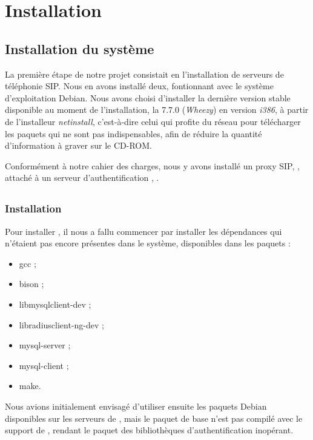 \section{Installation}

\subsection{Installation du système}

La première étape de notre projet consistait en l’installation de serveurs de téléphonie SIP. Nous en avons installé deux, fontionnant avec le système d’exploitation Debian. Nous avons choisi d’installer la dernière version stable disponible au moment de l’installation, la 7.7.0 (\textit{Wheezy}) en version \textit{i386}, à partir de l’installeur \textit{netinstall}, c’est-à-dire celui qui profite du réseau pour télécharger les paquets qui ne sont pas indispensables, afin de réduire la quantité d’information à graver sur le CD-ROM.

Conformément à notre cahier des charges, nous y avons installé un proxy SIP, {\kam}, attaché à un serveur d’authentification {\rad}, {\frad}.

\subsection{\kam}

\subsubsection{Installation}

Pour installer {\kam}, il nous a fallu commencer par installer les dépendances qui n’étaient pas encore présentes dans le système, disponibles dans les paquets :

\begin{itemize}
	\item{gcc} ;
	\item{bison} ;
	\item{libmysqlclient-dev} ;
	\item{libradiusclient-ng-dev} ;
	\item{mysql-server} ;
	\item{mysql-client} ;
	\item{make}.
\end{itemize}

Nous avions initialement envisagé d’utiliser ensuite les paquets Debian disponibles sur les serveurs de {\kam}, mais le paquet de base n’est pas compilé avec le support de {\rad}, rendant le paquet des bibliothèques d’authentification {\rad} inopérant.

